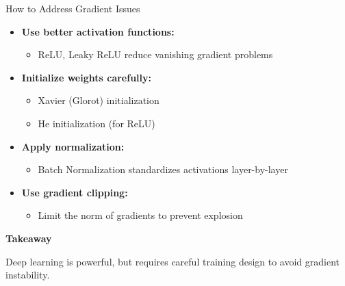 \documentclass[aspectratio=169]{beamer}
\begin{document}
\begin{frame}{How to Address Gradient Issues}

\begin{itemize}
    \item \textbf{Use better activation functions:}
    \begin{itemize}
        \item ReLU, Leaky ReLU reduce vanishing gradient problems
    \end{itemize}
    \item \textbf{Initialize weights carefully:}
    \begin{itemize}
        \item Xavier (Glorot) initialization
        \item He initialization (for ReLU)
    \end{itemize}
    \item \textbf{Apply normalization:}
    \begin{itemize}
        \item Batch Normalization standardizes activations layer-by-layer
    \end{itemize}
    \item \textbf{Use gradient clipping:}
    \begin{itemize}
        \item Limit the norm of gradients to prevent explosion
    \end{itemize}
\end{itemize}

\vspace{0.3cm}
\textbf{Takeaway}
\begin{block}{}
Deep learning is powerful, but requires careful training design to avoid gradient instability.
\end{block}

\end{frame}
%
\end{document}

